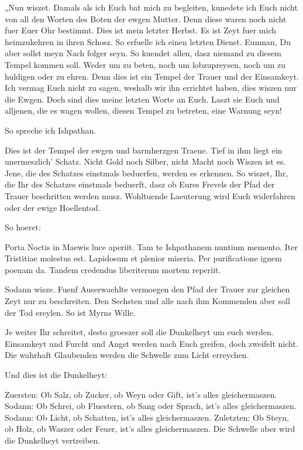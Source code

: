 \documentclass[a5paper,8pt]{book}
\begin{document}
„Nun wiszet. Damals als ich Euch bat mich zu begleiten, kunedete ich Euch nicht von all den Worten des Boten der ewgen Mutter. Denn diese waren noch nicht fuer Euer Ohr bestimmt. Dies ist mein letzter Herbst. Es ist Zeyt fuer mich heimzukehren in ihren Schosz. So erfuelle ich einen letzten Dienst. Eumnan, Du aber sollst meyn Nach folger seyn. So kuendet allen, dasz niemand zu diesem Tempel kommen soll. Weder um zu beten, noch um lobzupreysen, noch um zu huldigen oder zu ehren. Denn dies ist ein Tempel der Trauer und der Einsamkeyt. Ich vermag Euch nicht zu sagen, weshalb wir ihn errichtet haben, dies wiszen nur die Ewgen. Doch sind dies meine letzten Worte an Euch. Laszt sie Euch und alljenen, die es wagen wollen, diesen Tempel zu betreten, eine Warnung seyn!


\begin{huge}So spreche ich Ishpathan.\end{huge}


Dies ist der Tempel der ewgen und barmherzgen Traene. Tief in ihm liegt ein unermeszlich’ Schatz. Nicht Gold noch Silber, nicht Macht noch Wiszen ist es. Jene, die des Schatzes einstmals beduerfen, werden es erkennen. So wiszet, Ihr, die Ihr des Schatzes einstmals beduerft, dasz ob Eures Frevels der Pfad der Trauer beschritten werden musz. Wohltuende Laeuterung wird Euch widerfahren oder der ewige Hoellentod.



\begin{huge}So hoeret:\end{huge}
Porta Noctis in Maewis luce aperiit. Tam te Ishpathanem nuntium memento. Iter Tristitiae molestus est. Lapidosum et plenior miseria. Per purificatione ignem poenam da. Tandem credendus liberiterum mortem reperiit.

Sodann wisze.
Fuenf Auserwaehlte vermoegen den Pfad der Trauer zur gleichen Zeyt nur zu beschreiten. Den Sechsten und alle nach ihm Kommenden aber soll der Tod ereylen. So ist Myrns Wille. 

Je weiter Ihr schreitet, desto groeszer soll die Dunkelheyt um euch werden. Einsamkeyt und Furcht und Angst werden nach Euch greifen, doch zweifelt nicht. Die wahrhaft Glaubenden werden die Schwelle zum Licht erreychen. 

Und dies ist die Dunkelheyt:

Zuersten:
Ob Salz, ob Zucker, ob Weyn oder Gift, ist’s alles gleichermaszen.
Sodann:
Ob Schrei, ob Fluestern, ob Sang oder Sprach, ist’s alles gleichermaszen.
Sodann: 
Ob Licht, ob Schatten, ist’s alles gleichermaszen.
Zuletzten: 
Ob Steyn, ob Holz, ob Waszer oder Feuer, ist’s alles gleichermaszen.
Die Schwelle aber wird die Dunkelheyt vertreiben. 
\end{document}
